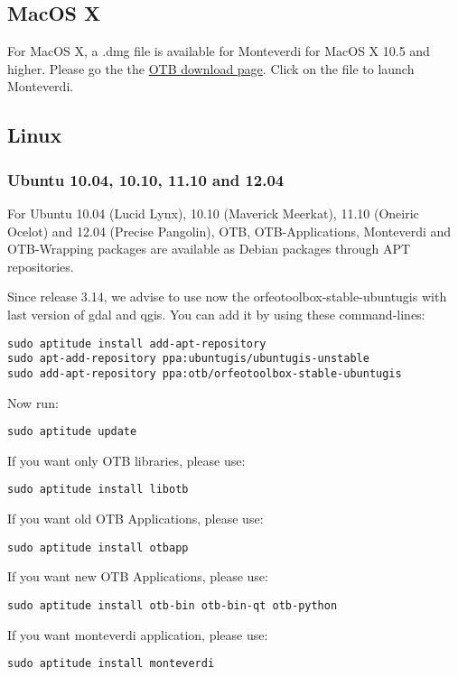 \subsection{MacOS X}
\label{ssec:mac_binaries}

For MacOS X, a .dmg file is available for Monteverdi for MacOS X 10.5 and higher. 
Please go the the \href{http://sourceforge.net/projects/orfeo-toolbox/}{OTB download page}.
Click on the file to launch Monteverdi.

\subsection{Linux}

\subsubsection{Ubuntu 10.04, 10.10, 11.10 and 12.04}
\label{ssec:ubuntu_binaries}
For Ubuntu 10.04 (Lucid Lynx), 10.10 (Maverick Meerkat), 11.10 (Oneiric Ocelot) and 12.04 (Precise Pangolin), OTB, 
OTB-Applications, Monteverdi and OTB-Wrapping packages are available as Debian packages 
through APT repositories.

Since release 3.14, we advise to use now the  orfeotoolbox-stable-ubuntugis with last version of gdal and qgis.
You can add it by using these command-lines:
\begin{verbatim}
sudo aptitude install add-apt-repository 
sudo apt-add-repository ppa:ubuntugis/ubuntugis-unstable
sudo add-apt-repository ppa:otb/orfeotoolbox-stable-ubuntugis
\end{verbatim}

Now run:
\begin{verbatim}
sudo aptitude update
\end{verbatim}
If you want only OTB libraries, please use:
\begin{verbatim}
sudo aptitude install libotb
\end{verbatim}

If you want old OTB Applications, please use:
\begin{verbatim}
sudo aptitude install otbapp
\end{verbatim}

If you want new OTB Applications, please use:
\begin{verbatim}
sudo aptitude install otb-bin otb-bin-qt otb-python
\end{verbatim}

If you want monteverdi application, please use:
\begin{verbatim}
sudo aptitude install monteverdi
\end{verbatim}

